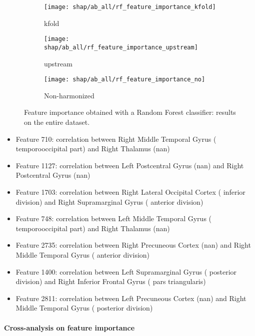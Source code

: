 \documentclass[10pt]{report}
\begin{document}
\begin{figure}
\centering
\begin{subfigure}[b]{.45\textwidth}
   \texttt{[image: shap/ab\_all/rf\_feature\_importance\_kfold]}
   \caption{kfold}
   \label{}
\end{subfigure}
\begin{subfigure}[b]{.45\textwidth}
   \texttt{[image: shap/ab\_all/rf\_feature\_importance\_upstream]}
   \caption{upstream}
   \label{}
\end{subfigure}
\begin{subfigure}[b]{.45\textwidth}
   \texttt{[image: shap/ab\_all/rf\_feature\_importance\_no]}
   \caption{Non-harmonized}
   \label{}
\end{subfigure}
\caption{Feature importance obtained with a Random Forest classifier: results on the entire dataset.}
\label{fig:shap_abide_rf_all}
\end{figure}



\begin{itemize}
\item Feature 710: correlation between Right Middle Temporal Gyrus ( temporooccipital part) and Right Thalamus (nan)
\item Feature 1127: correlation between Left Postcentral Gyrus (nan) and Right Postcentral Gyrus (nan)
\item Feature 1703: correlation between Right Lateral Occipital Cortex ( inferior division) and Right Supramarginal Gyrus ( anterior division)
\item Feature 748: correlation between Left Middle Temporal Gyrus ( temporooccipital part) and Right Thalamus (nan)
\item Feature 2735: correlation between Right Precuneous Cortex (nan) and Right Middle Temporal Gyrus ( anterior division)
\item Feature 1400: correlation between Left Supramarginal Gyrus ( posterior division) and Right Inferior Frontal Gyrus ( pars triangularis)
\item Feature 2811: correlation between Left Precuneous Cortex (nan) and Right Middle Temporal Gyrus ( posterior division)
\end{itemize}

\newpage
\paragraph{Cross-analysis on feature importance}
\end{document}

